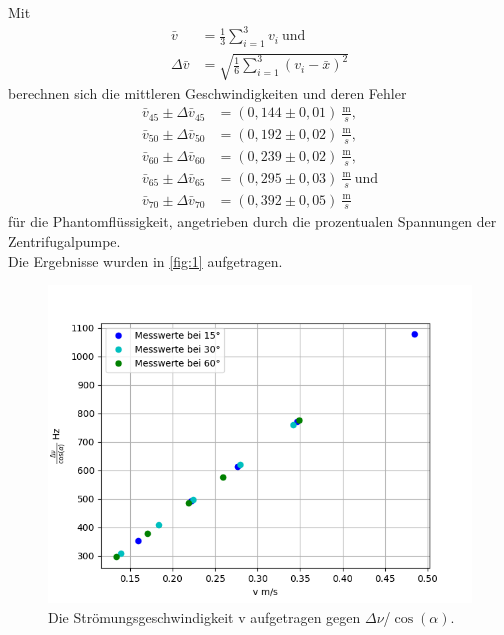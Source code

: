 Mit 
\begin{align*}
  \bar v&=\frac{1}{3}\sum\limits_{i=1}^{3} v_i\ \textrm{und}\\
  \Delta\bar v&=\sqrt{\frac{1}{6}\sum\limits_{i=1}^{3} (v_i - \bar x)^2}
\end{align*}
berechnen sich die mittleren Geschwindigkeiten und deren Fehler 
\begin{align*}
  \bar v_{45} \pm \Delta \bar v_{45}&=(0,144 \pm 0,01)\ \frac{\textrm{m}}{s},\\
  \bar v_{50} \pm \Delta \bar v_{50}&=(0,192 \pm 0,02)\ \frac{\textrm{m}}{s},\\
  \bar v_{60} \pm \Delta \bar v_{60}&=(0,239 \pm 0,02)\ \frac{\textrm{m}}{s},\\
  \bar v_{65} \pm \Delta \bar v_{65}&=(0,295 \pm 0,03)\ \frac{\textrm{m}}{s}\ \textrm{und}\\
  \bar v_{70} \pm \Delta \bar v_{70}&=(0,392 \pm 0,05)\ \frac{\textrm{m}}{s}
\end{align*}
für die Phantomflüssigkeit, angetrieben durch die prozentualen Spannungen der Zentrifugalpumpe.\\
Die Ergebnisse wurden in \autoref{fig:1} aufgetragen.
\begin{figure}[H]
  \centering
  \includegraphics[width=12cm]{content/1}
  \caption{Die Strömungsgeschwindigkeit v aufgetragen gegen $\Delta\nu$/$\cos(\alpha)$.}
  \label{fig:1}
\end{figure}

